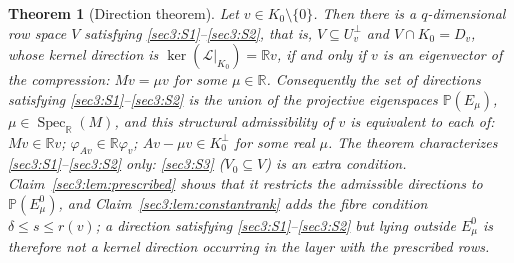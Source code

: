 \documentclass[journal]{IEEEtran}
\theoremstyle{plainn}
\newtheorem{thm}{Theorem}
\theoremstyle{remark}
\begin{document}
\begin{thm}[Direction theorem]
\label{sec3:thm:direction}
\label{sec3:rem:direction-set}
\label{sec3:rem:equiv}
Let $v\in K_0\setminus\{0\}$. Then there is a $q$-dimensional row space $V$ satisfying
\ref{sec3:S1}--\ref{sec3:S2}, that is, $V\subseteq U_v^\perp$ and $V\cap K_0=D_v$, whose kernel direction
is $\ker(\mathcal{L}|_{K_0})=\mathbb{R} v$, if and only if $v$ is an eigenvector of the compression:
$Mv=\mu v$ for some $\mu\in\mathbb{R}$. Consequently the set of directions satisfying
\ref{sec3:S1}--\ref{sec3:S2} is the union of the projective eigenspaces
$\mathbb{P}(E_\mu)$, $\mu\in\operatorname{Spec}_{\mathbb{R}}(M)$, and this structural admissibility of $v$
is equivalent to each of: $Mv\in\mathbb{R} v$; $\varphi_{Av}\in\mathbb{R}\varphi_v$; $Av-\mu v\in K_0^\perp$
for some real $\mu$. The theorem characterizes \ref{sec3:S1}--\ref{sec3:S2} only: \ref{sec3:S3}
($V_0\subseteq V$) is an extra condition. Claim~\ref{sec3:lem:prescribed} shows that it restricts the
admissible directions to $\mathbb{P}(E_\mu^0)$, and Claim~\ref{sec3:lem:constantrank} adds the fibre
condition $\delta\le s\le r(v)$; a direction satisfying \ref{sec3:S1}--\ref{sec3:S2} but lying outside
$E_\mu^0$ is therefore not a kernel direction occurring in the layer with the prescribed rows.
\end{thm}
\end{document}
